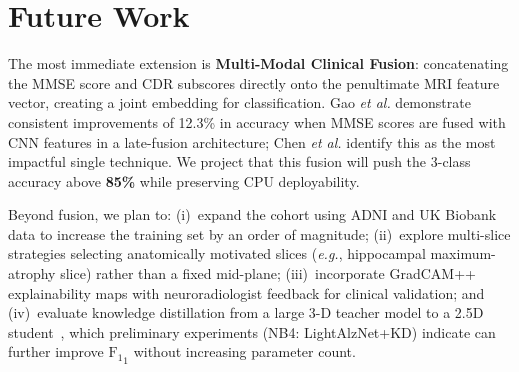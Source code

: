 \documentclass[conference]{IEEEtran}
\newcommand{\eg}{\textit{e.g.},\xspace}
\newcommand{\etal}{\textit{et al.}\xspace}
\newcommand{\F}{\mathrm{F_1}}
\begin{document}
\section{Future Work}
\label{sec:future}

The most immediate extension is \textbf{Multi-Modal Clinical
Fusion}: concatenating the MMSE score and CDR subscores directly
onto the penultimate MRI feature vector, creating a joint
embedding for classification. Gao \etal \cite{gao2024}
demonstrate consistent improvements of 12.3\% in accuracy when
MMSE scores are fused with CNN features in a late-fusion
architecture; Chen \etal \cite{chen2026} identify this as the
most impactful single technique. We project that this fusion
will push the 3-class accuracy above \textbf{85\%} while
preserving CPU deployability.

Beyond fusion, we plan to: (i)~expand the cohort using ADNI
and UK Biobank data to increase the training set by an order
of magnitude; (ii)~explore multi-slice strategies selecting
anatomically motivated slices (\eg hippocampal
maximum-atrophy slice) rather than a fixed mid-plane;
(iii)~incorporate GradCAM++ explainability maps with
neuroradiologist feedback for clinical validation; and
(iv)~evaluate knowledge distillation from a large 3-D teacher
model to a 2.5D student~\cite{dupont2026}, which preliminary
experiments (NB4: LightAlzNet+KD) indicate can further improve
$\F_1$ without increasing parameter count.
\end{document}
